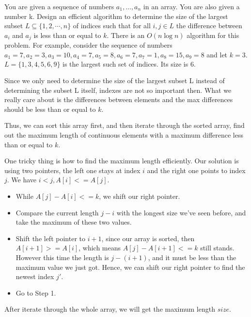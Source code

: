 \newpage
{} %

\problemdes

You are given a sequence of numbers $a_{1}, \dots, a_{n}$ in an array. You are also given a number k. Design an efficient algorithm to determine the size of the largest subset $L \subseteq\{1,2, \cdots, n\}$ of indices such that for all $i, j \in L$ the difference between $a_i$ and $a_j$ is less than or equal to $k$. There is an $O(n \log n)$ algorithm for this problem.
For example, consider the sequence of numbers $a_1 = 7,a_2 = 3,a_3 = 10,a_4 = 7,a_5 = 8,a_6 = 7,a_7 = 1,a_8 = 15,a_9 = 8$ and let $k = 3$. $L = \{1,3,4,5,6,9\}$ is the largest such set of indices. Its size is 6.

\solution


Since we only need to determine the size of the largest subset L instead of determining the subset L itself, indexes are not so important then. What we really care about is the differences between elements and the max differences should be less than or equal to $k$. 

Thus, we can sort this array first, and then iterate through the sorted array, find out the maximum length of continuous elements with a maximum difference less than or equal to $k$. 

One tricky thing is how to find the maximum length efficiently. Our solution is using two pointers, the left one stays at index $i$ and the right one points to index $j$. We have $i<j, A[i]<=A[j]$. 

\begin{itemize}
\item While $A[j]-A[i]<=k$, we shift our right pointer. 
\item Compare the current length $j-i$ with the longest size we've seen before, and take the maximum of these two values.
\item Shift the left pointer to $i+1$, since our array is sorted, then $A[i+1]>=A[i]$, which means $A[j]-A[i+1]<=k$ still stands. However this time the length is $j-(i+1)$, and it must be less than the maximum value we just got. Hence, we can shift our right pointer to find the newest index $j'$.
\item Go to Step 1.
\end{itemize}

After iterate through the whole array, we will get the maximum length $size$.

